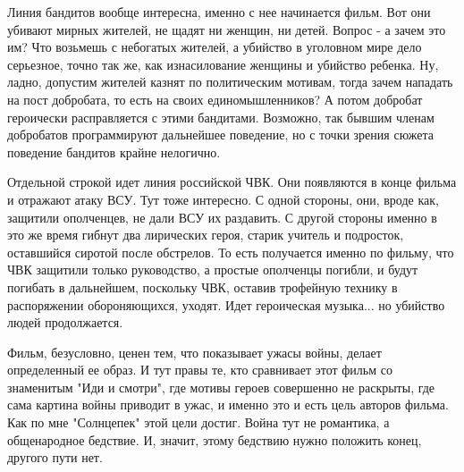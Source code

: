 Линия бандитов вообще интересна, именно с нее начинается фильм. Вот они убивают
мирных жителей, не щадят ни женщин, ни детей. Вопрос - а зачем это им? Что
возьмешь с небогатых жителей, а убийство в уголовном мире дело серьезное, точно
так же, как изнасилование женщины и убийство ребенка. Ну, ладно, допустим
жителей казнят по политическим мотивам, тогда зачем нападать на пост добробата,
то есть на своих единомышленников? А потом добробат героически расправляется с
этими бандитами. Возможно, так бывшим членам добробатов программируют
дальнейшее поведение, но с точки зрения сюжета поведение бандитов крайне
нелогично. 

Отдельной строкой идет линия российской ЧВК. Они появляются в конце фильма и
отражают атаку ВСУ. Тут тоже интересно. С одной стороны, они, вроде как,
защитили ополченцев, не дали ВСУ их раздавить. С другой стороны именно в это же
время гибнут два лирических героя, старик учитель и подросток, оставшийся
сиротой после обстрелов. То есть получается именно по фильму, что ЧВК защитили
только руководство, а простые ополченцы погибли, и будут погибать в дальнейшем,
поскольку ЧВК, оставив трофейную технику в распоряжении обороняющихся, уходят.
Идет героическая музыка... но убийство людей продолжается. 

Фильм, безусловно, ценен тем, что показывает ужасы войны, делает определенный
ее образ. И тут правы те, кто сравнивает этот фильм со знаменитым "Иди и
смотри", где мотивы героев совершенно не раскрыты, где сама картина войны
приводит в ужас, и именно это и есть цель авторов фильма. Как по мне
"Солнцепек" этой цели достиг. Война тут не романтика, а общенародное бедствие.
И, значит, этому бедствию нужно положить конец, другого пути нет.

